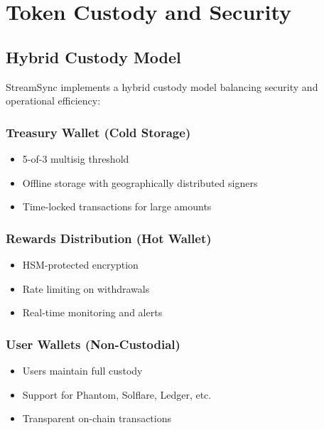 \documentclass[12pt,a4paper]{article}
\begin{document}
\section{Token Custody and Security}

\subsection{Hybrid Custody Model}

StreamSync implements a hybrid custody model balancing security and operational efficiency:

\subsubsection{Treasury Wallet (Cold Storage)}
\begin{itemize}
    \item 5-of-3 multisig threshold \cite{multisig2023}
    \item Offline storage with geographically distributed signers
    \item Time-locked transactions for large amounts
\end{itemize}

\subsubsection{Rewards Distribution (Hot Wallet)}
\begin{itemize}
    \item HSM-protected encryption \cite{hsm2019}
    \item Rate limiting on withdrawals
    \item Real-time monitoring and alerts
\end{itemize}

\subsubsection{User Wallets (Non-Custodial)}
\begin{itemize}
    \item Users maintain full custody
    \item Support for Phantom, Solflare, Ledger, etc.
    \item Transparent on-chain transactions
\end{itemize}
\end{document}
